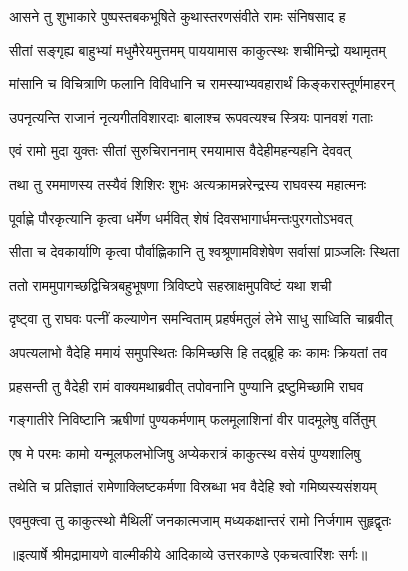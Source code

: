 \twolineshloka
{आसने तु शुभाकारे पुष्पस्तबकभूषिते}
{कुथास्तरणसंवीते रामः संनिषसाद ह} %

\twolineshloka
{सीतां सङ्गृह्य बाहुभ्यां मधुमैरेयमुत्तमम्}
{पाययामास काकुत्स्थः शचीमिन्द्रो यथामृतम्} %

\twolineshloka
{मांसानि च विचित्राणि फलानि विविधानि च}
{रामस्याभ्यवहारार्थं किङ्करास्तूर्णमाहरन्} %

\twolineshloka
{उपनृत्यन्ति राजानं नृत्यगीतविशारदाः}
{बालाश्च रूपवत्यश्च स्त्रियः पानवशं गताः} %

\twolineshloka
{एवं रामो मुदा युक्तः सीतां सुरुचिराननाम्}
{रमयामास वैदेहीमहन्यहनि देववत्} %

\twolineshloka
{तथा तु रममाणस्य तस्यैवं शिशिरः शुभः}
{अत्यक्रामन्नरेन्द्रस्य राघवस्य महात्मनः} %

\twolineshloka
{पूर्वाह्णे पौरकृत्यानि कृत्वा धर्मेण धर्मवित्}
{शेषं दिवसभागार्धमन्तःपुरगतोऽभवत्} %

\twolineshloka
{सीता च देवकार्याणि कृत्वा पौर्वाह्णिकानि तु}
{श्वश्रूणामविशेषेण सर्वासां प्राञ्जलिः स्थिता} %

\twolineshloka
{ततो राममुपागच्छद्विचित्रबहुभूषणा}
{त्रिविष्टपे सहस्राक्षमुपविष्टं यथा शची} %

\twolineshloka
{दृष्ट्वा तु राघवः पत्नीं कल्याणेन समन्विताम्}
{प्रहर्षमतुलं लेभे साधु साध्विति चाब्रवीत्} %

\twolineshloka
{अपत्यलाभो वैदेहि ममायं समुपस्थितः}
{किमिच्छसि हि तद्ब्रूहि कः कामः क्रियतां तव} %

\twolineshloka
{प्रहसन्ती तु वैदेही रामं वाक्यमथाब्रवीत्}
{तपोवनानि पुण्यानि द्रष्टुमिच्छामि राघव} %

\twolineshloka
{गङ्गातीरे निविष्टानि ऋषीणां पुण्यकर्मणाम्}
{फलमूलाशिनां वीर पादमूलेषु वर्तितुम्} %

\twolineshloka
{एष मे परमः कामो यन्मूलफलभोजिषु}
{अप्येकरात्रं काकुत्स्थ वसेयं पुण्यशालिषु} %

\twolineshloka
{तथेति च प्रतिज्ञातं रामेणाक्लिष्टकर्मणा}
{विस्रब्धा भव वैदेहि श्वो गमिष्यस्यसंशयम्} %

\twolineshloka
{एवमुक्त्वा तु काकुत्स्थो मैथिलीं जनकात्मजाम्}
{मध्यकक्षान्तरं रामो निर्जगाम सुहृद्वृतः} %


{॥इत्यार्षे श्रीमद्रामायणे वाल्मीकीये आदिकाव्ये उत्तरकाण्डे एकचत्वारिंशः सर्गः॥}


